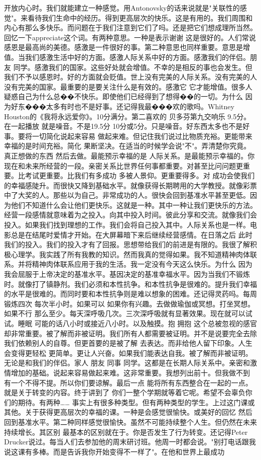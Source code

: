 开放内心时。我们就能建立一种感觉。用Antonovsky的话来说就是"关联性的感觉"。来看待我们生命中的经历。得到更高层次的快乐。这是有用的。我们周围和内心有那么多快乐。而问题在于我们注意到它们了吗。还是把它们想成理所当然。回忆一下appreciate这个词。有两种意思。一种是表示谢谢 这是很好的。人们常说感恩是最高尚的美德。感激是一件很好的事。第二种意思也同样重要。意思是增值。当我们感激生活中好的方面。感激人际关系中好的方面。感激我们的伴侣。朋友 同学。感激我们的国家。这些好处就会增值。不幸的是相反的事也会发生。但我们不予以感恩时。好的方面就会贬值。世上没有完美的人际关系。没有完美的人 没有完美的国家。最重要的是要关注什么是有效的。感激它 它才能增值。很多人疑惑自己为什么总��不快乐。即使他们已经得到了想得��的一切。为什么 因为好东���太多有时也不是好事。还记得我最���欢的歌吗。Whitney Houston的《我将永远爱你》。10分满分。第二喜欢的 贝多芬第九交响乐 9.5分。在一起播放 就是噪音。不是19.5分 10分或5分。只是噪音。好东西太多也不是好事。要将一切简化说起来容易 做起来难。但记住我们说过比物质充裕。更能带来幸福的是时间充裕。简化 果断坚决。在适当的时候学会说"不"。弄清楚你究竟。真正想做的东西 然后去做。最能预示幸福的是 人际关系。是最能预示幸福的。你现在和未来所经营的一段。亲密关系比世界任何事都重要。对甚至比问问题更重要。比考试更重要。比我们有多成功 多被人景仰。更重要得多。对 成功会使我们的幸福感陡升。而很快又降到基础水平。就像获得长期聘用的大学教授。就像彩票中了大奖的人。那些以为自己。非常成功的人。很快会回到基准水平甚至更低。因为他们不知道什么会让他们更快乐。这就是一种。其中一种让我们更快乐的方法。经营一段感情就意味着为之投入。向其中投入时间。彼此分享和交流。就像我们会投入。如果我们找到理想的工作。我们会将自己投入其中。人际关系也是一样。电影总是在结尾时爱情才开始。在大屏幕暗下来后继续经营感情。在日落之后 此时我们的投入。我们的投入才有了回报。思想带给我们的前进是有限的。我很了解积极心理学。我实践了所有我教的知识。然而我真的觉得如果。我不知道精神肉体联系。并将精神肉体联系应用于我的生活。我一定没有今天这么快乐。为什么 因为我会屈服于上帝决定的基准水平。基因决定的基准幸福水平。因为当我们不锻炼时。就像打了镇静剂。我们必须和本性抗争。和本性抗争是很难的。提升我们幸福的水平是很难的。而同时要和本性抗争则是难以想象的困难。还记得灵药吗。每周锻炼四次 每次半小时。如果可以 如果你有兴趣。去做做瑜伽或冥想。打坐冥想。如果不行 那么至少。每天深呼吸几次。三次深呼吸就有显著效果。现在就可以试试。睡眠 可能的话八小时或接近八小时。以及触摸。抱 拥抱 这个总被忽视的感官却非常重要。被了解而非被证明。我们所有人都需要被证明。并不是说要完全去除我们依赖别人的自尊。但更首要的是被了解 去表达。而非给他人留下印象。人生会变得更轻松 更简单。更让人兴奋。如果我们能表达自我。被了解而非被证明。无论是和我们的伴侣。家人 朋友 同事 同学。这都是在长期人际关系中。亲密和激情增加的基础。说起来容易做起来难。这非常重要。我想列出前十。但我做不到 有一个不得不提。所以你们要谅解。最后一点 能将所有东西整合在一起的一点。就是关于转变的内容。终于讲到了 你们一整个学期就等着它呢。希望不会辜负你们的期待。有两种…… 事实上有很多种类型。但有两种类型的学生。上过这门课或其他。关于获得更高层次的幸福的课。一种是会感觉很愉快。或美好的回忆 然后回到基准水平。第二种同样感觉很愉快。虽然不可能持续整个人生。但仍然在未来持续增长。其区别 最基本的区别就在于。你是否发生了行为转变。还记得Peter Drucker说过。每当人们去参加他的周末研讨班。他周一时都会说。"别打电话跟我说这课有多棒。而是告诉我你开始变得不一样了"。在他和世界上最成功 